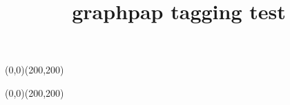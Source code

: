 \documentclass{article}
\title{graphpap tagging test}
\begin{document}
\graphpaper(0,0)(200,200)

\vspace{2cm}

\graphpaper[20](0,0)(200,200)
\end{document}
